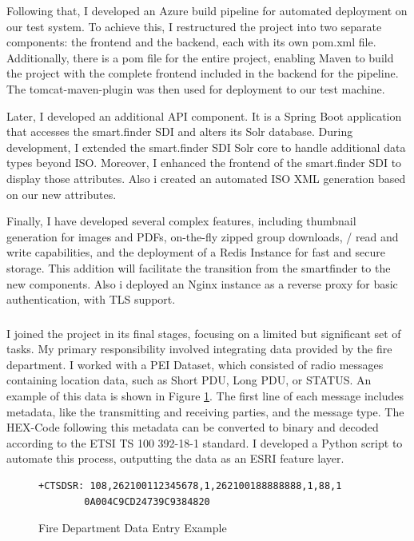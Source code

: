 \documentclass[11pt, titlepage, a4paper]{article}
\begin{document}
Following that, I developed an Azure build pipeline for automated deployment on our test system.  To achieve this, I restructured the project into two separate components: the frontend and the backend, each with its own pom.xml file. Additionally, there is a pom file for the entire project, enabling Maven to build the project with the complete frontend included in the backend for the pipeline. The tomcat-maven-plugin was then used for deployment to our test machine.

Later, I developed an additional API component. It is a Spring Boot application that accesses the smart.finder SDI and alters its Solr database. During development, I extended the smart.finder SDI Solr core to handle additional data types beyond ISO. Moreover, I enhanced the frontend of the smart.finder SDI to display those attributes.
Also i created an automated ISO XML generation based on our new attributes.

Finally, I have developed several complex features, including thumbnail generation for images and PDFs, on-the-fly zipped group downloads, / read and write capabilities, and the deployment of a Redis Instance for fast and secure storage. This addition will facilitate the transition from the smartfinder to the new components. Also i deployed an Nginx instance as a reverse proxy for basic authentication, with TLS support.


\subsubsection{}
I joined the project in its final stages, focusing on a limited but significant set of tasks. My primary responsibility involved integrating data provided by the fire department. I worked with a PEI Dataset, which consisted of radio messages containing location data, such as Short PDU, Long PDU, or STATUS. An example of this data is shown in Figure \ref{fig:pei}. The first line of each message includes metadata, like the transmitting and receiving parties, and the message type. The HEX-Code following this metadata can be converted to binary and decoded according to the ETSI TS 100 392-18-1 standard. I developed a Python script to automate this process, outputting the data as an ESRI feature layer.

\begin{figure}[H]
    \caption{Fire Department Data Entry Example}
    \label{fig:pei}
    \begin{lstlisting}[frame=single]
        +CTSDSR: 108,262100112345678,1,262100188888888,1,88,1
        0A004C9CD24739C9384820
    \end{lstlisting}
    \centering
\end{figure}
\end{document}
